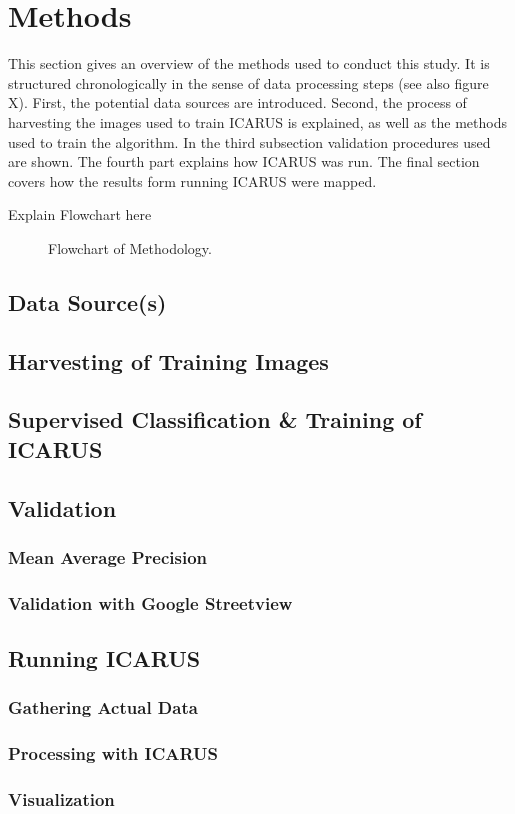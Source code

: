\section{Methods}
	This section gives an overview of the methods used to conduct this study. It is structured chronologically in the sense of data processing steps (see also figure X). First, the potential data sources are introduced. Second, the process of harvesting the images used to train ICARUS is explained, as well as the methods used to train the algorithm. In the third subsection validation procedures used are shown. The fourth part explains how ICARUS was run. The final section covers how the results form running ICARUS were mapped.
	\bigskip
	
	Explain Flowchart here
	
	\bigskip
	
	\begin{figure}
        \centering
	    
	    \caption{Flowchart of Methodology.}
	\end{figure}

	\bigskip
	
	\newpage
	    
	    \subsection{Data Source(s)}
		\subsection{Harvesting of Training Images}
		\subsection{Supervised Classification & Training of ICARUS}
		\subsection{Validation}
		    \subsubsection{Mean Average Precision}
		    \subsubsection{Validation with Google Streetview}
		\subsection{Running ICARUS}
		    \subsubsection{Gathering Actual Data}
		    \subsubsection{Processing with ICARUS}
		\subsubsection{Visualization}
